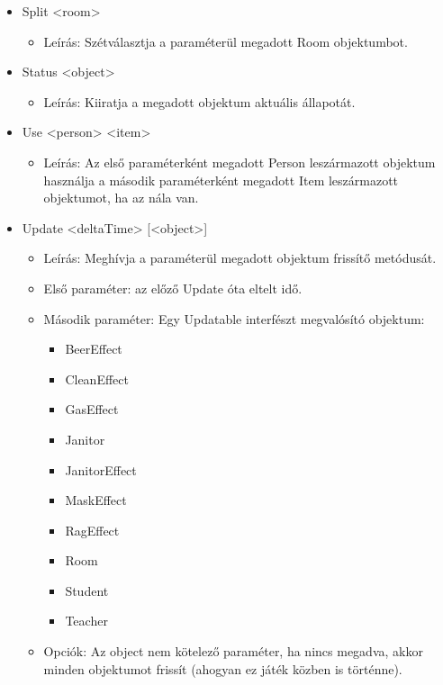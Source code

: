 \begin{itemize}
    \item Split <room>
    \begin{itemize}
        \item 
        Leírás: Szétválasztja a paraméterül megadott Room objektumbot.
    \end{itemize}

    \item Status <object>
    \begin{itemize}
        \item Leírás: Kiiratja a megadott objektum aktuális állapotát.
    \end{itemize}
    
    \item Use <person> <item>
    \begin{itemize}
        \item Leírás: Az első paraméterként megadott Person leszármazott objektum használja a második paraméterként megadott Item leszármazott objektumot, ha az nála van.
    \end{itemize}
    
    \item Update <deltaTime> [<object>]
    \begin{itemize}
        \item Leírás: Meghívja a paraméterül megadott objektum frissítő metódusát.
        \item Első paraméter: az előző Update óta eltelt idő.
        \item Második paraméter: Egy Updatable interfészt megvalósító objektum:
        \begin{itemize}
            \item BeerEffect
            \item CleanEffect
            \item GasEffect
            \item Janitor
            \item JanitorEffect
            \item MaskEffect
            \item RagEffect
            \item Room
            \item Student
            \item Teacher
        \end{itemize}
        \item Opciók: Az object nem kötelező paraméter, ha nincs megadva, akkor minden objektumot frissít (ahogyan ez játék közben is történne).
    \end{itemize}
\end{itemize}


